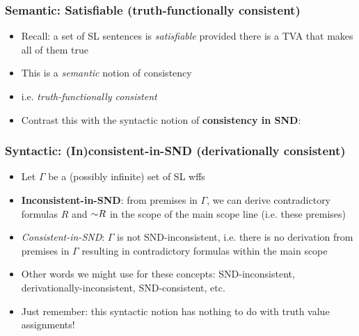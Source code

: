 \begin{frame}
\frametitle{Semantic: Satisfiable (truth-functionally consistent)}

\begin{itemize}[<+->]

\item Recall: a set of SL sentences is \emph{satisfiable} provided there is a TVA that makes all of them true


\item This is a \textit{semantic} notion of consistency

\item i.e. \emph{truth-functionally consistent} 


\item Contrast this with the syntactic notion of \textbf{consistency in SND}:

\end{itemize}
\end{frame}




\begin{frame}
\frametitle{Syntactic: (In)consistent-in-SND (derivationally consistent)}

\begin{itemize}[<+->]

\item Let $\Gamma$ be a (possibly infinite) set of SL wffs 

\item \textbf{\textcolor{OGlyallpink}{Inconsistent-in-SND}}: from premises in $\Gamma$, we can derive contradictory formulas $R$ and $\enot R$ in the scope of the main scope line (i.e. these premises)

\item \emph{Consistent-in-SND}: $\Gamma$ is not SND-inconsistent, i.e. there is no derivation from premises in $\Gamma$ resulting in contradictory formulas within the main scope

\item Other words we might use for these concepts: SND-inconsistent, derivationally-inconsistent, SND-consistent, etc.

\item Just remember: this syntactic notion has nothing to do with truth value assignments!

\end{itemize}
\end{frame}



